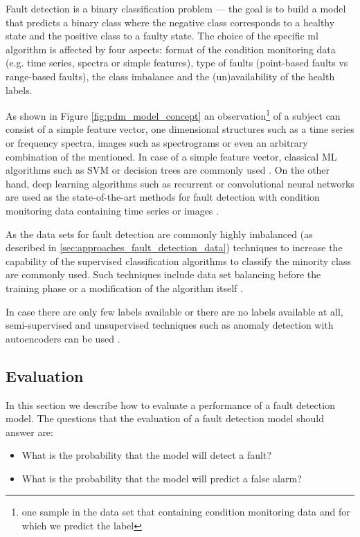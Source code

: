 Fault detection is a binary classification problem --- the goal is to build a model that predicts a binary class where the negative class corresponds to a healthy state and the positive class to a faulty state.
The choice of the specific \gls{ml} algorithm is affected by four aspects: format of the condition monitoring data (e.g. time series, spectra or simple features), type of faults (point-based faults vs range-based faults), the class imbalance and the (un)availability of the health labels.

As shown in Figure \ref{fig:pdm_model_concept} an observation\footnote{one sample in the data set that containing condition monitoring data and for which we predict the label} of a subject can consist of a simple feature vector, one dimensional structures such as a time series or frequency spectra, images such as spectrograms or even an arbitrary combination of the mentioned.
In case of a simple feature vector, classical ML algorithms such as SVM or decision trees are commonly used \cite{santos2015svm, mahadevan2009fault, zhao2012decision}.
On the other hand, deep learning algorithms such as recurrent or convolutional neural networks are used as the state-of-the-art methods for fault detection with condition monitoring data containing time series or images \cite{guo2017deep, jia2016deep, janssens2016convolutional,yuan2019}.


As the data sets for fault detection are commonly highly imbalanced (as described in \ref{sec:approaches_fault_detection_data}) techniques to increase the capability of the supervised classification algorithms to classify the minority class are commonly used.
Such techniques include data set balancing before the training phase or a modification of the algorithm itself \cite{borovicka2012selecting}.

In case there are only few labels available or there are no labels available at all, semi-supervised and unsupervised techniques such as anomaly detection with autoencoders can be used \cite{chandola2009anomaly, yuan2019}.

\subsection{Evaluation}
\label{sec:approaches_fault_detection_evaluation}

In this section we describe how to evaluate a performance of a fault detection model.
The questions that the evaluation of a fault detection model should answer are:
\begin{itemize}
    \item What is the probability that the model will detect a fault?
    \item What is the probability that the model will predict a false alarm?
\end{itemize}

